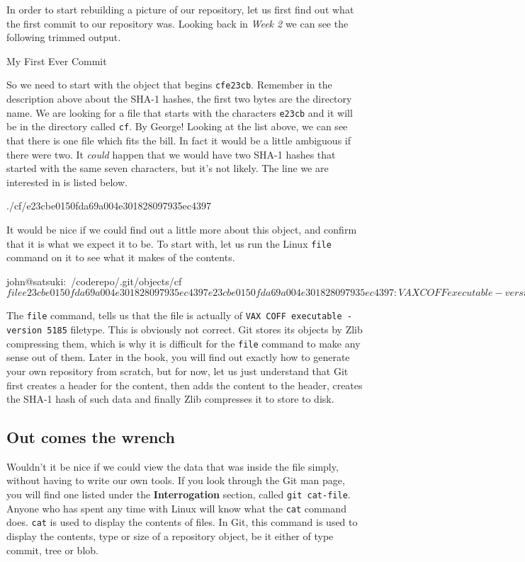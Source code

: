 In order to start rebuilding a picture of our repository, let us first find out what the first commit to our repository was.
Looking back in \emph{Week 2} we can see the following trimmed output.

\begin{code}
 My First Ever Commit
\end{code}

So we need to start with the object that begins \texttt{cfe23cb}.
Remember in the description above about the SHA-1 hashes, the first two bytes are the directory name.
We are looking for a file that starts with the characters \texttt{e23cb} and it will be in the directory called \texttt{cf}.
By George! Looking at the list above, we can see that there is one file which fits the bill.
In fact it would be a little ambiguous if there were two.
It \emph{could} happen that we would have two SHA-1 hashes that started with the same seven characters, but it's not likely.
The line we are interested in is listed below.

\begin{code}
./cf/e23cbe0150fda69a004e301828097935ec4397
\end{code}

It would be nice if we could find out a little more about this object, and confirm that it is what we expect it to be.
To start with, let us run the Linux \texttt{file} command on it to see what it makes of the contents.

\begin{code}
john@satsuki:~/coderepo/.git/objects/cf$ file e23cbe0150fda69a004e301828097935ec4397
e23cbe0150fda69a004e301828097935ec4397: VAX COFF executable - version 5185
john@satsuki:~/coderepo/.git/objects/cf$
\end{code}

The \texttt{file} command, tells us that the file is actually of \texttt{VAX COFF executable - version 5185} filetype.
This is obviously not correct.
Git stores its objects by Zlib compressing them, which is why it is difficult for the \texttt{file} command to make any sense out of them.
Later in the book, you will find out exactly how to generate your own repository from scratch, but for now, let us just understand that Git first creates a header for the content, then adds the content to the header, creates the SHA-1 hash of such data and finally Zlib compresses it to store to disk.

\subsection{Out comes the wrench}
Wouldn't it be nice if we could view the data that was inside the file simply, without having to write our own tools.
If you look through the Git man page, you will find one listed under the \textbf{Interrogation} section, called \texttt{git cat-file}.
Anyone who has spent any time with Linux will know what the \texttt{cat} command does.
\texttt{cat} is used to display the contents of files.
In Git, this command is used to display the contents, type or size of a repository object, be it either of type commit, tree or blob.


